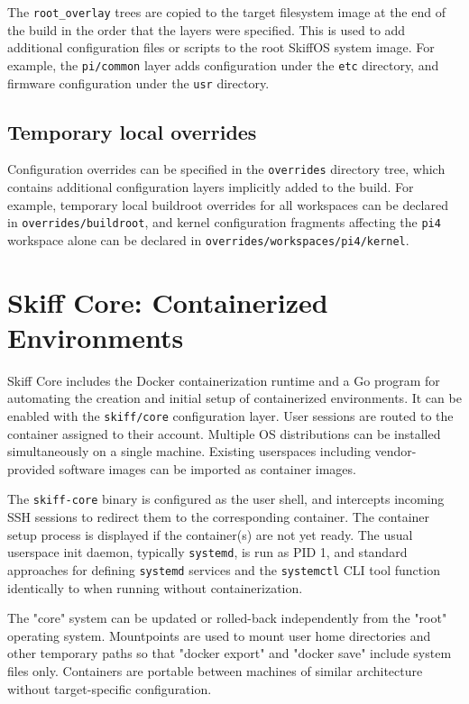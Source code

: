 \documentclass[english,]{IEEEtran}
\begin{document}
The \texttt{root\_overlay} trees are copied to the target filesystem
image at the end of the build in the order that the layers were
specified. This is used to add additional configuration files or scripts
to the root SkiffOS system image. For example, the \texttt{pi/common}
layer adds configuration under the \texttt{etc} directory, and firmware
configuration under the \texttt{usr} directory.

\hypertarget{temporary-local-overrides}{%
\subsection{Temporary local overrides}\label{temporary-local-overrides}}

Configuration overrides can be specified in the \texttt{overrides}
directory tree, which contains additional configuration layers
implicitly added to the build. For example, temporary local buildroot
overrides for all workspaces can be declared in
\texttt{overrides/buildroot}, and kernel configuration fragments
affecting the \texttt{pi4} workspace alone can be declared in
\texttt{overrides/workspaces/pi4/kernel}.

\hypertarget{skiff-core-containerized-environments}{%
\section{Skiff Core: Containerized
Environments}\label{skiff-core-containerized-environments}}

Skiff Core includes the Docker containerization runtime and a Go program
for automating the creation and initial setup of containerized
environments. It can be enabled with the \texttt{skiff/core}
configuration layer. User sessions are routed to the container assigned
to their account. Multiple OS distributions can be installed
simultaneously on a single machine. Existing userspaces including
vendor-provided software images can be imported as container images.

The \texttt{skiff-core} binary is configured as the user shell, and
intercepts incoming SSH sessions to redirect them to the corresponding
container. The container setup process is displayed if the container(s)
are not yet ready. The usual userspace init daemon, typically
\texttt{systemd}, is run as PID 1, and standard approaches for defining
\texttt{systemd} services and the \texttt{systemctl} CLI tool function
identically to when running without containerization.

The "core" system can be updated or rolled-back independently from the
"root" operating system. Mountpoints are used to mount user home
directories and other temporary paths so that "docker export" and
"docker save" include system files only. Containers are portable between
machines of similar architecture without target-specific configuration.
\end{document}
